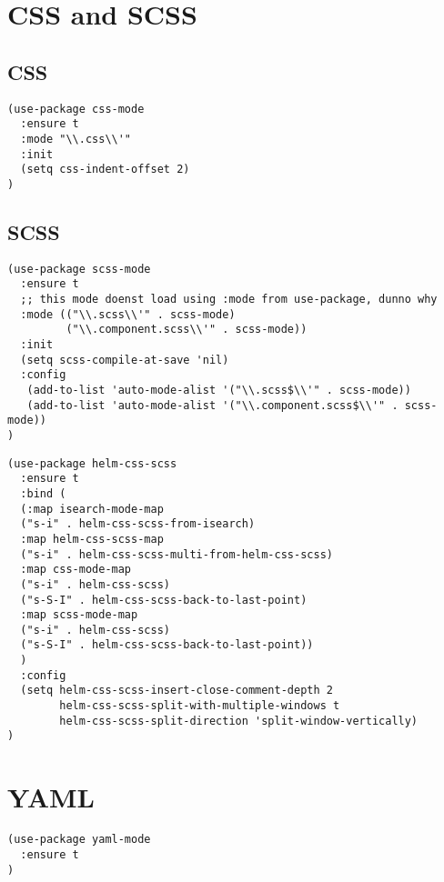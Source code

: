 \documentclass[11pt]{article}
\begin{document}
\section*{CSS and SCSS}
\label{sec:orgcf9c04c}

\subsection*{CSS}
\label{sec:org8f4e220}

\begin{verbatim}
(use-package css-mode
  :ensure t
  :mode "\\.css\\'"
  :init
  (setq css-indent-offset 2)
)
\end{verbatim}

\subsection*{SCSS}
\label{sec:org3366b68}
\begin{verbatim}
(use-package scss-mode
  :ensure t
  ;; this mode doenst load using :mode from use-package, dunno why
  :mode (("\\.scss\\'" . scss-mode)
         ("\\.component.scss\\'" . scss-mode))
  :init
  (setq scss-compile-at-save 'nil)
  :config
   (add-to-list 'auto-mode-alist '("\\.scss$\\'" . scss-mode))
   (add-to-list 'auto-mode-alist '("\\.component.scss$\\'" . scss-mode))
)
\end{verbatim}

\begin{verbatim}
(use-package helm-css-scss
  :ensure t
  :bind (
  (:map isearch-mode-map
  ("s-i" . helm-css-scss-from-isearch)
  :map helm-css-scss-map
  ("s-i" . helm-css-scss-multi-from-helm-css-scss)
  :map css-mode-map
  ("s-i" . helm-css-scss)
  ("s-S-I" . helm-css-scss-back-to-last-point)
  :map scss-mode-map
  ("s-i" . helm-css-scss)
  ("s-S-I" . helm-css-scss-back-to-last-point))
  )
  :config
  (setq helm-css-scss-insert-close-comment-depth 2
        helm-css-scss-split-with-multiple-windows t
        helm-css-scss-split-direction 'split-window-vertically)
)
\end{verbatim}

\section*{YAML}
\label{sec:org6c4b7ec}
\begin{verbatim}
(use-package yaml-mode
  :ensure t
)
\end{verbatim}
\end{document}
